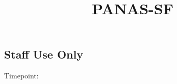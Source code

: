 \documentclass[
  14pt,
  english,
  a4paper,
  sdaps_style=code128,
  checkmode=check,
  print_questionnaire_id
]{sdapsclassic}
\title{PANAS-SF}
\author{}
\date{}
\begin{document}
\begin{questionnaire}[noinfo]


\section{Staff Use Only}

    \noindent
    \begin{minipage}[t]{0.48\linewidth}
    \end{minipage}\hfill
    \begin{minipage}[t]{0.48\linewidth}
    \end{minipage}

    \noindent
    \begin{minipage}[c]{3cm}
        Timepoint:
    \end{minipage}%
    \begin{minipage}[c]{\dimexpr\linewidth-1cm\relax}
        \begin{optionquestion}[cols=4, var=timepoint]{}
        \end{optionquestion}
    \end{minipage}


\end{questionnaire}
\end{document}
